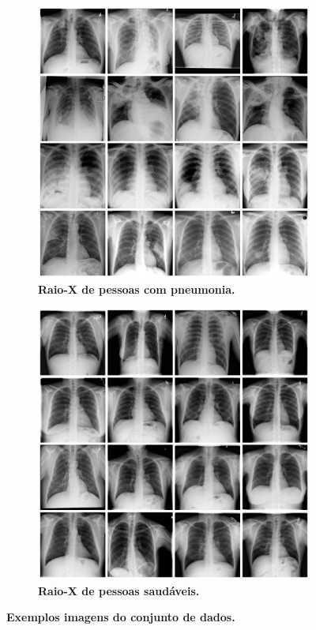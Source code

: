 \documentclass[
12pt,        %
oneside,     %
a4paper,     %
english,       %
brazil        %
%
%
]{ppgca}
\begin{document}
\begin{figure}[H]
\begin{subfigure}[b]{0.49\textwidth}
        \includegraphics[width=\textwidth]{quadropneumo.png}
        \centering
        \caption{\textbf{Raio-X de pessoas com pneumonia.}}
        \label{fig:quadropneumo}
    \end{subfigure}
    \vfill
    \begin{subfigure}[b]{0.49\textwidth}
        \includegraphics[width=\textwidth]{quadrosaudavel.png}
        \centering
        \caption{\textbf{Raio-X de pessoas saudáveis.}}
        \label{fig:quadrosaudavel}
    \end{subfigure}
    \caption{\textbf{Exemplos imagens do conjunto de dados.}}
    \label{fig:quadroimagens}
\end{figure}
\end{document}
